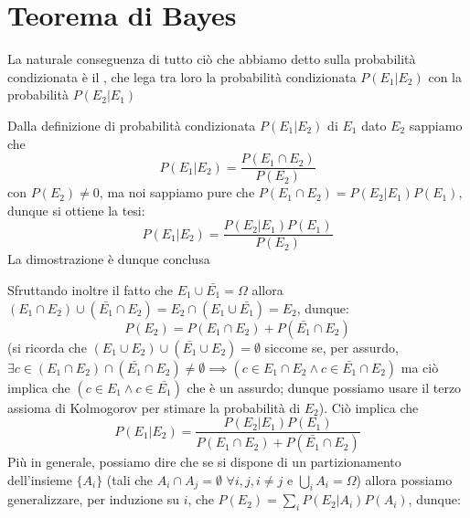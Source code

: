 \documentclass{report}
\begin{document}
\section{Teorema di Bayes}
La naturale conseguenza di tutto ciò che abbiamo detto sulla probabilità condizionata è il \textit{}, che lega tra loro la probabilità condizionata $P(E_1 | E_2)$ con la probabilità $P(E_2 | E_1)$
\begin{myproof}
	Dalla definizione di probabilità condizionata $P(E_1 | E_2)$ di $E_1$ dato $E_2$ sappiamo che
	$$
		P(E_1 | E_2) = \frac{P(E_1 \cap E_2)}{P(E_2)}
	$$
	con $P(E_2) \neq 0$, ma noi sappiamo pure che $P(E_1 \cap E_2) = P(E_2 | E_1)P(E_1)$, dunque si ottiene la tesi:
	$$
		P(E_1 | E_2) = \frac{P(E_2 | E_1)P(E_1)}{P(E_2)}
	$$
	La dimostrazione è dunque conclusa
\end{myproof}
\noindent Sfruttando inoltre il fatto che $E_1 \cup \bar{E_1} = \Omega$ allora $(E_1 \cap E_2) \cup (\bar{E_1} \cap E_2) = E_2 \cap (E_1 \cup \bar{E_1}) = E_2$, dunque:
$$
	P(E_2) = P(E_1 \cap E_2) + P(\bar{E_1} \cap E_2)
$$
(si ricorda che $(E_1 \cup E_2) \cup (\bar{E_1} \cup E_2) = \emptyset$ siccome se, per assurdo, $\exists c \in (E_1 \cap E_2) \cap (\bar{E_1} \cap E_2) \neq \emptyset \implies (c \in E_1 \cap E_2  \wedge c \in \bar{E_1} \cap E_2 )$ ma ciò implica che $(c \in E_1 \wedge c \in \bar{E_1})$ che è un assurdo; dunque possiamo usare il terzo assioma di Kolmogorov per stimare la probabilità di $E_2$). Ciò implica che
\begin{equation}
	P(E_1 | E_2) = \frac{P(E_2 | E_1)P(E_1)}{P(E_1 \cap E_2) + P(\bar{E_1} \cap E_2)}
\end{equation}
Più in generale, possiamo dire che se si dispone di un partizionamento dell'insieme $ \{ A_i \} $ (tali che $A_i \cap A_j = \emptyset \, \, \forall i, j, i \neq j$ e $\bigcup\limits_{i} A_i = \Omega$) allora possiamo generalizzare, per induzione su $i$, che $P(E_2) = \sum\limits_{i} P(E_2 | A_i)P(A_i)$, dunque:
\end{document}
